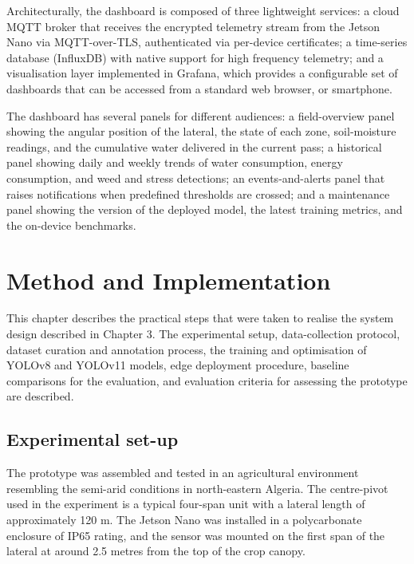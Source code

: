 \documentclass[12pt,a4paper]{report}
\begin{document}
Architecturally, the dashboard is composed of three lightweight services: a cloud MQTT broker that receives the encrypted telemetry stream from the Jetson Nano via MQTT-over-TLS, authenticated via per-device certificates; a time-series database (InfluxDB) with native support for high frequency telemetry; and a visualisation layer implemented in Grafana, which provides a configurable set of dashboards that can be accessed from a standard web browser, or smartphone.

The dashboard has several panels for different audiences: a field-overview panel showing the angular position of the lateral, the state of each zone, soil-moisture readings, and the cumulative water delivered in the current pass; a historical panel showing daily and weekly trends of water consumption, energy consumption, and weed and stress detections; an events-and-alerts panel that raises notifications when predefined thresholds are crossed; and a maintenance panel showing the version of the deployed model, the latest training metrics, and the on-device benchmarks.

\chapter{Method and Implementation}
\pagestyle{fancy}
\thispagestyle{empty}

This chapter describes the practical steps that were taken to realise the system design described in Chapter 3. The experimental setup, data-collection protocol, dataset curation and annotation process, the training and optimisation of YOLOv8 and YOLOv11 models, edge deployment procedure, baseline comparisons for the evaluation, and evaluation criteria for assessing the prototype are described.

\section{Experimental set-up}

The prototype was assembled and tested in an agricultural environment resembling the semi-arid conditions in north-eastern Algeria. The centre-pivot used in the experiment is a typical four-span unit with a lateral length of approximately 120 m. The Jetson Nano was installed in a polycarbonate enclosure of IP65 rating, and the sensor was mounted on the first span of the lateral at around 2.5 metres from the top of the crop canopy.
\end{document}
